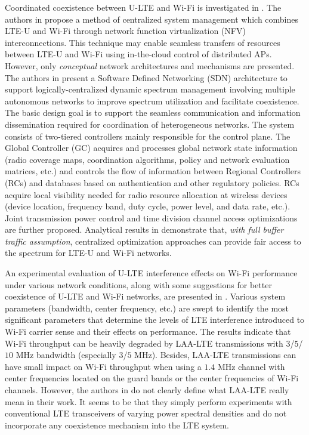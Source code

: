 Coordinated coexistence between \mbox{U-LTE} and \mbox{Wi-Fi} is investigated in \cite{U-LTE-5G-2015, Coordinated-LTE-U-Wi-Fi-2015}. The authors in \cite{U-LTE-5G-2015} propose a method of centralized system management which combines \mbox{LTE-U} and \mbox{Wi-Fi} through network function virtualization (NFV) interconnections. This technique may enable seamless transfers of resources between \mbox{LTE-U} and \mbox{Wi-Fi} using in-the-cloud control of distributed APs. However, only \textit{conceptual} network architectures and mechanisms are presented. The authors in \cite{Coordinated-LTE-U-Wi-Fi-2015} present a Software Defined Networking (SDN) architecture to support logically-centralized dynamic spectrum management involving multiple autonomous networks to improve spectrum utilization and facilitate coexistence. The basic design goal is to support the seamless communication and information dissemination required for coordination of heterogeneous networks. The system consists of two-tiered controllers mainly responsible for the control plane. The Global Controller (GC) acquires and processes global network state information (radio coverage maps, coordination algorithms, policy and network evaluation matrices, etc.) and controls the flow of information between Regional Controllers (RCs) and databases based on authentication and other regulatory policies. RCs acquire local visibility needed for radio resource allocation at wireless devices (device location, frequency band, duty cycle, power level, and data rate, etc.). Joint transmission power control and time division channel access optimizations are further proposed. Analytical results in \cite{Coordinated-LTE-U-Wi-Fi-2015} demonstrate that, \textit{with full buffer traffic assumption}, centralized optimization approaches can provide fair access to the spectrum for \mbox{LTE-U} and \mbox{Wi-Fi} networks.

An experimental evaluation of \mbox{U-LTE} interference effects on \mbox{Wi-Fi} performance under various network conditions, along with some suggestions for better coexistence of \mbox{U-LTE} and \mbox{Wi-Fi} networks, are presented in \cite{LTE-U-Experiment-ICC-WS-2015}. Various system parameters (bandwidth, center frequency, etc.) are swept to identify the most significant parameters that determine the levels of LTE interference introduced to \mbox{Wi-Fi} carrier sense and their effects on performance. The results indicate that \mbox{Wi-Fi} throughput can be heavily degraded by \mbox{LAA-LTE} transmissions with $3$/$5$/$10$ MHz bandwidth (especially $3$/$5$ MHz). Besides, \mbox{LAA-LTE} transmissions can have small impact on \mbox{Wi-Fi} throughput when using a $1.4$ MHz channel with center frequencies located on the guard bands or the center frequencies of \mbox{Wi-Fi} channels. However, the authors in \cite{LTE-U-Experiment-ICC-WS-2015} do not clearly define what \mbox{LAA-LTE} really mean in their work. It seems to be that they simply perform experiments with conventional LTE transceivers of varying power spectral densities and do not incorporate any coexistence mechanism into the LTE system.


